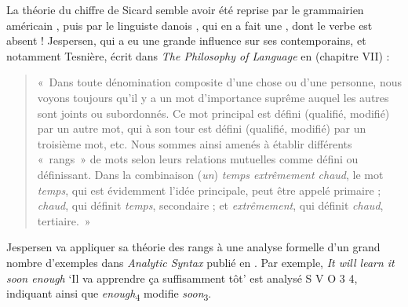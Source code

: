 {    La théorie du chiffre de Sicard semble avoir été reprise par le grammairien américain , puis par le linguiste danois , qui en a fait une , dont le verbe est absent ! Jespersen, qui a eu une grande influence sur ses contemporains, et notamment Tesnière, écrit dans \textit{The Philosophy of Language} en \citeyear{jespersen1924philosophy} (chapitre VII) : 
    \begin{quote}«~Dans toute dénomination composite d’une chose ou d’une personne, nous voyons toujours qu’il y a un mot d’importance suprême auquel les autres sont joints ou subordonnés. Ce mot principal est défini (qualifié, modifié) par un autre mot, qui à son tour est défini (qualifié, modifié) par un troisième mot, etc. Nous sommes ainsi amenés à établir différents «~rangs~» de mots selon leurs relations mutuelles comme défini ou définissant. Dans la combinaison (\textit{un}) \textit{temps extrêmement chaud}, le mot \textit{temps}, qui est évidemment l’idée principale, peut être appelé primaire ; \textit{chaud}, qui définit \textit{temps}, secondaire ; et \textit{extrêmement}, qui définit \textit{chaud}, tertiaire.~»  \end{quote}
    Jespersen va appliquer sa théorie des rangs à une analyse formelle d’un grand nombre d’exemples dans \textit{Analytic Syntax} publié en \citeyear{jespersen1937analytic}. Par exemple, \textit{It will learn it soon enough} ‘Il va apprendre ça suffisamment tôt’ est analysé S V O 3 4, indiquant ainsi que \textit{enough}\textsubscript{4} modifie \textit{soon}\textsubscript{3}.

}
